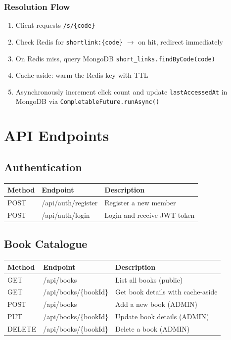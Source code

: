 \documentclass[12pt,a4paper]{report}
\begin{document}
\subsection{Resolution Flow}
\begin{enumerate}[noitemsep]
    \item Client requests \texttt{/s/\{code\}}
    \item Check Redis for \texttt{shortlink:\{code\}} $\rightarrow$ on hit, redirect immediately
    \item On Redis miss, query MongoDB \texttt{short\_links.findByCode(code)}
    \item Cache-aside: warm the Redis key with TTL
    \item Asynchronously increment click count and update \texttt{lastAccessedAt} in MongoDB via \texttt{CompletableFuture.runAsync()}
\end{enumerate}


\chapter{API Endpoints}

\section{Authentication}
\begin{table}[H]
\centering
\begin{tabularx}{\textwidth}{l l X}
\toprule
\textbf{Method} & \textbf{Endpoint} & \textbf{Description} \\
\midrule
POST & /api/auth/register & Register a new member \\
POST & /api/auth/login & Login and receive JWT token \\
\bottomrule
\end{tabularx}
\end{table}

\section{Book Catalogue}
\begin{table}[H]
\centering
\begin{tabularx}{\textwidth}{l l X}
\toprule
\textbf{Method} & \textbf{Endpoint} & \textbf{Description} \\
\midrule
GET & /api/books & List all books (public) \\
GET & /api/books/\{bookId\} & Get book details with cache-aside \\
POST & /api/books & Add a new book (ADMIN) \\
PUT & /api/books/\{bookId\} & Update book details (ADMIN) \\
DELETE & /api/books/\{bookId\} & Delete a book (ADMIN) \\
\bottomrule
\end{tabularx}
\end{table}
\end{document}
